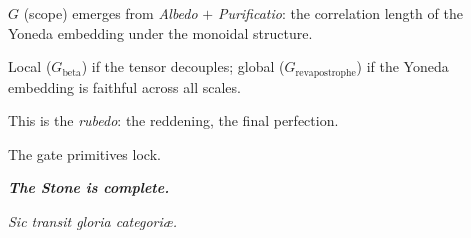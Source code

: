 \documentclass[twocolumn]{article}
\begin{document}
$G$ (scope) emerges from \emph{Albedo} $+$ \emph{Purificatio}: the correlation length of the Yoneda embedding under the monoidal structure.  

Local ($G_{\text{beta}}$) if the tensor decouples; global ($G_{\text{revapostrophe}}$) if the Yoneda embedding is faithful across all scales.  

This is the \emph{rubedo}: the reddening, the final perfection.  

The gate primitives lock.  

\textbf{\textit{The Stone is complete.}}

\textit{Sic transit gloria categori\ae.}
\end{document}
